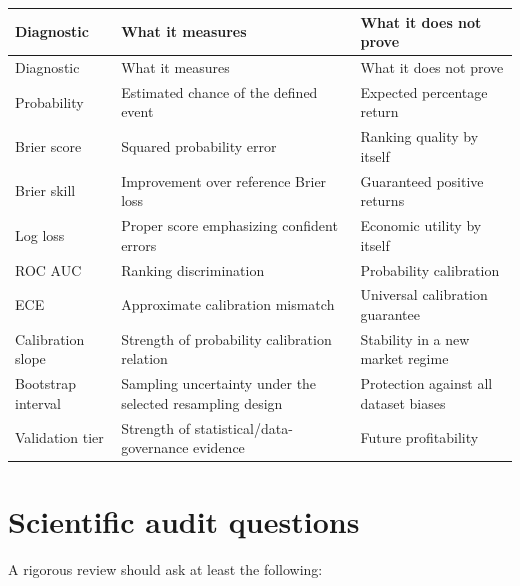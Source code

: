 \documentclass[11pt]{article}
\begin{document}
\begin{longtable}{@{}p{}p{}p{}@{}}
\toprule
Diagnostic & What it measures & What it does not prove \\
\midrule
\endfirsthead
\toprule
Diagnostic & What it measures & What it does not prove \\
\midrule
\endhead
Probability & Estimated chance of the defined event & Expected percentage return \\
Brier score & Squared probability error & Ranking quality by itself \\
Brier skill & Improvement over reference Brier loss & Guaranteed positive returns \\
Log loss & Proper score emphasizing confident errors & Economic utility by itself \\
ROC AUC & Ranking discrimination & Probability calibration \\
ECE & Approximate calibration mismatch & Universal calibration guarantee \\
Calibration slope & Strength of probability calibration relation & Stability in a new market regime \\
Bootstrap interval & Sampling uncertainty under the selected resampling design & Protection against all dataset biases \\
Validation tier & Strength of statistical/data-governance evidence & Future profitability \\
\bottomrule
\end{longtable}

\section{Scientific audit questions}

A rigorous review should ask at least the following:
\end{document}
